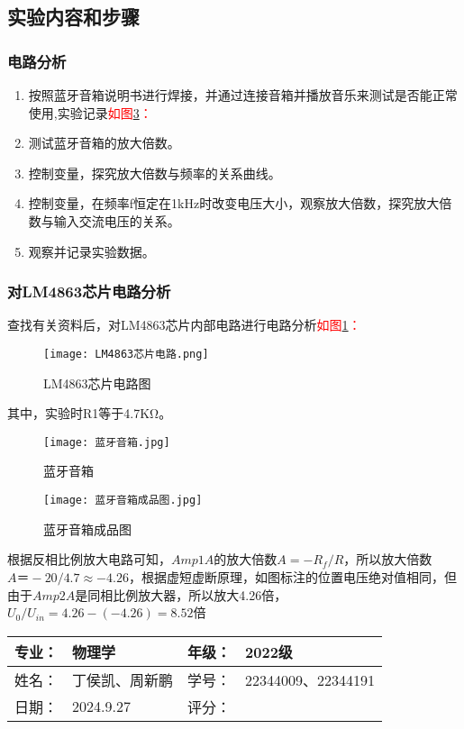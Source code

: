 \documentclass[dvipsnames, svgnames,a4paper,11pt]{article}
\begin{document}
\subsection{实验内容和步骤}
	\subsubsection{电路分析}
		\begin{enumerate}
		\item 按照蓝牙音箱说明书进行焊接，并通过连接音箱并播放音乐来测试是否能正常使用,实验记录\textcolor{red}{如图\ref{fig:蓝牙音箱成品图}：}
		\item 测试蓝牙音箱的放大倍数。
		\item 控制变量，探究放大倍数与频率的关系曲线。
		\item 控制变量，在频率f恒定在1kHz时改变电压大小，观察放大倍数，探究放大倍数与输入交流电压的关系。
		\item 观察并记录实验数据。
		\end{enumerate}


	\subsubsection{对LM4863芯片电路分析}
		查找有关资料后，对LM4863芯片内部电路进行电路分析\textcolor{red}{如图\ref{fig:LM4863芯片电路图}：}
	\begin{figure}[htbp]
		\centering
		\texttt{[image: LM4863芯片电路.png]}
		\caption{LM4863芯片电路图}
		\label{fig:LM4863芯片电路图}
	\end{figure}
	其中，实验时R1等于4.7KΩ。

	\begin{figure}[htbp]
		\centering
		\texttt{[image: 蓝牙音箱.jpg]}
		\caption{蓝牙音箱}
		\label{fig:蓝牙音箱}
	\end{figure}

	\begin{figure}[htbp]
		\centering
		\texttt{[image: 蓝牙音箱成品图.jpg]}
		\caption{蓝牙音箱成品图}
		\label{fig:蓝牙音箱成品图}
	\end{figure}
	
	
	根据反相比例放大电路可知，$Amp1A$的放大倍数$A=-R_f/R$，所以放大倍数$A＝-20/4.7≈-4.26$，根据虚短虚断原理，如图标注的位置电压绝对值相同，但由于$Amp2A$是同相比例放大器，所以放大4.26倍，$U_0/U_{in}=4.26-(-4.26)=8.52$倍
		
\clearpage
\begin{table}
	\renewcommand\arraystretch{1.7}
	\begin{tabularx}{\textwidth}{|X|X|X|X|}
	\hline
	专业：& 物理学 &年级：& 2022级\\
	\hline
	姓名： &丁侯凯、周新鹏 & 学号：&22344009、22344191 \\
	\hline
    日期：&2024.9.27 & 评分： &\\
	\hline
	\end{tabularx}
\end{table}
\end{document}
